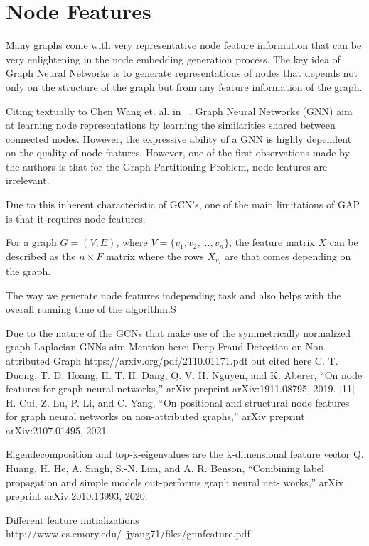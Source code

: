 \section{Node Features}
Many graphs come with very representative node feature information that can be very enlightening in the node embedding generation process. The key idea of Graph Neural Networks is to generate representations of nodes that depends not only on the structure of the graph but from any feature information of the graph. 

Citing textually to Chen Wang et. al. in ~\cite{nodefeatures}, Graph Neural Networks (GNN) aim at learning node representations by learning the similarities shared between connected nodes. However, the expressive ability of a GNN
is highly dependent on the quality of node features.
However, one of the first observations made by the authors is that for the Graph Partitioning Problem, node features are irrelevant.

Due to this inherent characteristic of GCN's, one of the main limitations of GAP is that it requires node features.

For a graph $G = (V,E)$, where $V=\{v_1, v_2, ..., v_n\}$, the feature matrix $X$ can be described as the $n\times F$ matrix where the rows $X_{v_i}$ are that comes depending on the graph.

The way we generate node features independing task and also helps with the overall running time of the algorithm.S

Due to the nature of the GCNs that make use of the symmetrically normalized graph Laplacian
GNNs aim 
Mention here: Deep Fraud Detection on Non-attributed Graph
https://arxiv.org/pdf/2110.01171.pdf
but cited here
C. T. Duong, T. D. Hoang, H. T. H. Dang, Q. V. H. Nguyen, and
K. Aberer, “On node features for graph neural networks,” arXiv preprint
arXiv:1911.08795, 2019.
[11] H. Cui, Z. Lu, P. Li, and C. Yang, “On positional and structural node
features for graph neural networks on non-attributed graphs,” arXiv
preprint arXiv:2107.01495, 2021

Eigendecomposition and top-k-eigenvalues are the k-dimensional feature vector
Q. Huang, H. He, A. Singh, S.-N. Lim, and A. R. Benson, “Combining
label propagation and simple models out-performs graph neural net-
works,” arXiv preprint arXiv:2010.13993, 2020.

Different feature initializations
http://www.cs.emory.edu/~jyang71/files/gnnfeature.pdf

